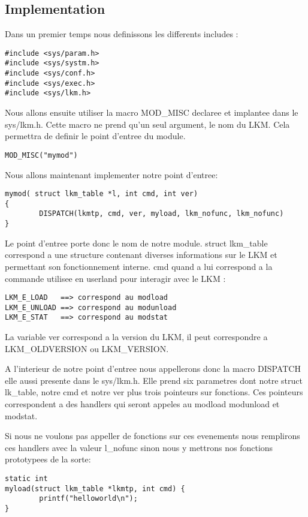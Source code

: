 \documentclass[a4paper, 11pt]{article}
\begin{document}
\subsection{Implementation}
Dans un premier temps nous definissons les differents includes :
\begin{lstlisting}
#include <sys/param.h>
#include <sys/systm.h>
#include <sys/conf.h>
#include <sys/exec.h>
#include <sys/lkm.h>
\end{lstlisting}
\par Nous allons ensuite utiliser la macro MOD\_MISC declaree et implantee dans le
sys/lkm.h. Cette macro ne prend qu'un seul argument, le nom du LKM. Cela
permettra de definir le point d'entree du module.
\begin{lstlisting}
MOD_MISC("mymod")
\end{lstlisting}
\par Nous allons maintenant implementer notre point d'entree:
\begin{lstlisting}
mymod( struct lkm_table *l, int cmd, int ver) 
{
        DISPATCH(lkmtp, cmd, ver, myload, lkm_nofunc, lkm_nofunc)
}
\end{lstlisting}
\par Le point d'entree porte donc le nom de notre module. struct lkm\_table
correspond a une structure contenant diverses informations sur le LKM et
permettant son fonctionnement interne. cmd quand a lui correspond a la commande
utilisee en userland pour interagir avec le LKM :
\begin{lstlisting}
LKM_E_LOAD   ==> correspond au modload
LKM_E_UNLOAD ==> correspond au modunload
LKM_E_STAT   ==> correspond au modstat
\end{lstlisting}
\par La variable ver correspond a la version du LKM, il peut correspondre a LKM\_OLDVERSION
ou LKM\_VERSION.\\\par A l'interieur de notre point d'entree nous appellerons donc la
macro DISPATCH elle aussi presente dans le sys/lkm.h. Elle prend six
parametres dont notre struct lk\_table, notre cmd et notre ver plus trois
pointeurs sur fonctions. Ces pointeurs correspondent a des handlers qui seront
appeles au modload modunload et modstat.\\\par  Si nous ne voulons pas appeller de fonctions
sur ces evenements nous remplirons ces handlers avec la valeur l\_nofunc sinon
nous y mettrons nos fonctions prototypees de la sorte:
\begin{lstlisting}
static int
myload(struct lkm_table *lkmtp, int cmd) {
        printf("helloworld\n");
}
\end{lstlisting}
\end{document}

